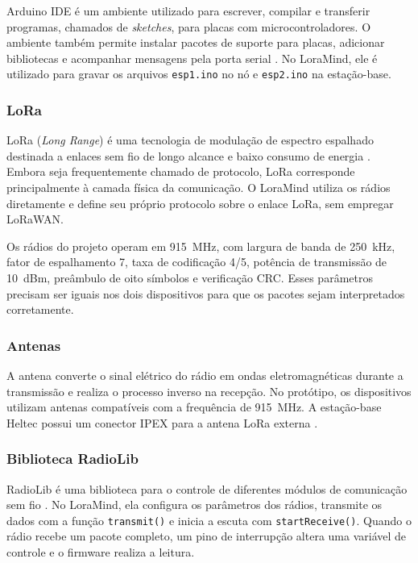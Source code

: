 \documentclass[12pt]{article}
\begin{document}
Arduino IDE é um ambiente utilizado para escrever, compilar e transferir programas, chamados de \textit{sketches}, para placas com microcontroladores. O ambiente também permite instalar pacotes de suporte para placas, adicionar bibliotecas e acompanhar mensagens pela porta serial \cite{arduinoide2026}. No LoraMind, ele é utilizado para gravar os arquivos \texttt{esp1.ino} no nó e \texttt{esp2.ino} na estação-base.

\subsubsection{LoRa}
\label{subsubsec:lora}

LoRa (\textit{Long Range}) é uma tecnologia de modulação de espectro espalhado destinada a enlaces sem fio de longo alcance e baixo consumo de energia \cite{semtechlora2026,augustin2016study}. Embora seja frequentemente chamado de protocolo, LoRa corresponde principalmente à camada física da comunicação. O LoraMind utiliza os rádios diretamente e define seu próprio protocolo sobre o enlace LoRa, sem empregar LoRaWAN.

Os rádios do projeto operam em 915~MHz, com largura de banda de 250~kHz, fator de espalhamento 7, taxa de codificação 4/5, potência de transmissão de 10~dBm, preâmbulo de oito símbolos e verificação CRC. Esses parâmetros precisam ser iguais nos dois dispositivos para que os pacotes sejam interpretados corretamente.

\subsubsection{Antenas}

A antena converte o sinal elétrico do rádio em ondas eletromagnéticas durante a transmissão e realiza o processo inverso na recepção. No protótipo, os dispositivos utilizam antenas compatíveis com a frequência de 915~MHz. A estação-base Heltec possui um conector IPEX para a antena LoRa externa \cite{heltecwifi32v32026}.


\subsubsection{Biblioteca RadioLib}

RadioLib é uma biblioteca para o controle de diferentes módulos de comunicação sem fio \cite{radiolib2026}. No LoraMind, ela configura os parâmetros dos rádios, transmite os dados com a função \texttt{transmit()} e inicia a escuta com \texttt{startReceive()}. Quando o rádio recebe um pacote completo, um pino de interrupção altera uma variável de controle e o firmware realiza a leitura.
\end{document}
